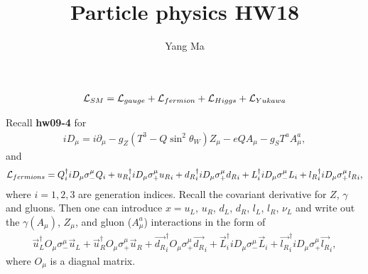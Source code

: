 \documentclass[11pt]{article}
\def\del{{\partial}}
\begin{document}
\title{Particle physics HW18}
\author{Yang Ma}

\maketitle

\section{ }
\begin{eqnarray}
    {\cal L}_{SM} = {\cal L}_{gauge} + {\cal L}_{fermion} + {\cal L}_{Higgs} + {\cal L}_{Yukawa} \label{eq.8LSM}
\end{eqnarray}

Recall {\bf hw09-4} for 
\begin{eqnarray}
    iD_\mu = i\del_\mu -g_Z (T^3-Q \sin^2\theta_W ) Z_\mu -e Q A_\mu -g_S T^a A^a_\mu,
  \end{eqnarray}
  and 
\begin{eqnarray}
    {\cal L}_{fermions} =  Q_i^\dagger iD_\mu \sigma_-^\mu Q_i
    + {u_R}_i^\dagger iD_\mu \sigma_+^\mu {u_R}_i
    + {d_R}_i^\dagger iD_\mu \sigma_+^\mu {d_R}_i
    +  L_i^\dagger iD_\mu \sigma_-^\mu L_i
    + {l_R}_i^\dagger iD_\mu \sigma_+^\mu {l_R}_i,
  \end{eqnarray}
  where $i=1,2,3$ are generation indices. Recall the covariant derivative for $Z$, $\gamma$ and gluons.
  Then one can introduce $x=u_L$, $u_R$, $d_L$, $d_R$, $l_L$, $l_R$, $\nu_L$ and write out the $\gamma (A_\mu)$, $Z_\mu$, and gluon ($A^a_\mu$) interactions in the form of 
\begin{eqnarray}
    \vec{u}^\dagger_L O_\mu \sigma_-^\mu \vec{u}_L + \vec{u}^\dagger_R O_\mu \sigma_+^\mu \vec{u}_R  + \vec{d_R}_i^\dagger O_\mu \sigma_+^\mu \vec{d_R}_i
    +  \vec{L}_i^\dagger iD_\mu \sigma_-^\mu \vec{L}_i
    + \vec{l_R}_i^\dagger iD_\mu \sigma_+^\mu \vec{l_R}_i,
\end{eqnarray}
where $O_\mu$ is a diagnal matrix. 
\end{document}
